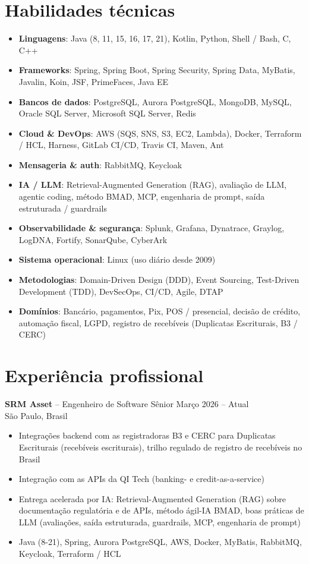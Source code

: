 \documentclass[10pt,a4paper]{article}
\begin{document}
\section{Habilidades técnicas}
\begin{itemize}
\item \textbf{Linguagens}: Java (8, 11, 15, 16, 17, 21), Kotlin, Python, Shell / Bash, C, C++
\item \textbf{Frameworks}: Spring, Spring Boot, Spring Security, Spring Data, MyBatis, Javalin, Koin, JSF, PrimeFaces, Java EE
\item \textbf{Bancos de dados}: PostgreSQL, Aurora PostgreSQL, MongoDB, MySQL, Oracle SQL Server, Microsoft SQL Server, Redis
\item \textbf{Cloud \& DevOps}: AWS (SQS, SNS, S3, EC2, Lambda), Docker, Terraform / HCL, Harness, GitLab CI/CD, Travis CI, Maven, Ant
\item \textbf{Mensageria \& auth}: RabbitMQ, Keycloak
\item \textbf{IA / LLM}: Retrieval-Augmented Generation (RAG), avaliação de LLM, agentic coding, método BMAD, MCP, engenharia de prompt, saída estruturada / guardrails
\item \textbf{Observabilidade \& segurança}: Splunk, Grafana, Dynatrace, Graylog, LogDNA, Fortify, SonarQube, CyberArk
\item \textbf{Sistema operacional}: Linux (uso diário desde 2009)
\item \textbf{Metodologias}: Domain-Driven Design (DDD), Event Sourcing, Test-Driven Development (TDD), DevSecOps, CI/CD, Agile, DTAP
\item \textbf{Domínios}: Bancário, pagamentos, Pix, POS / presencial, decisão de crédito, automação fiscal, LGPD, registro de recebíveis (Duplicatas Escriturais, B3 / CERC)
\end{itemize}

\section{Experiência profissional}

\noindent\textbf{SRM Asset} -- Engenheiro de Software Sênior \hfill Março 2026 -- Atual\\
São Paulo, Brasil
\begin{itemize}
\item Integrações backend com as registradoras B3 e CERC para Duplicatas Escriturais (recebíveis escriturais), trilho regulado de registro de recebíveis no Brasil
\item Integração com as APIs da QI Tech (banking- e credit-as-a-service)
\item Entrega acelerada por IA: Retrieval-Augmented Generation (RAG) sobre documentação regulatória e de APIs, método ágil-IA BMAD, boas práticas de LLM (avaliações, saída estruturada, guardrails, MCP, engenharia de prompt)
\item Java (8-21), Spring, Aurora PostgreSQL, AWS, Docker, MyBatis, RabbitMQ, Keycloak, Terraform / HCL
\end{itemize}
\end{document}
